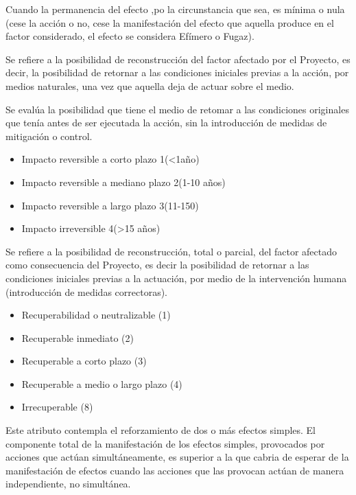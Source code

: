 Cuando la permanencia del efecto ,po la circunstancia que sea, es mínima o nula (cese la acción o no, cese la manifestación del efecto que aquella produce en el factor considerado, el efecto se considera Efímero o Fugaz).
\begin{definition}[Reversibilidad (RV)]
    Se refiere a la posibilidad de reconstrucción del factor afectado por el Proyecto, es decir, la posibilidad de retornar a las condiciones iniciales previas a la acción, por medios naturales, una vez que aquella deja de actuar sobre el medio.
\end{definition}

Se evalúa la posibilidad que tiene el medio de retomar a las condiciones originales que tenía antes de ser ejecutada la acción, sin la introducción de medidas de mitigación o control.
\begin{itemize}
    \item Impacto reversible a corto plazo 1(<1año)
    \item Impacto reversible a mediano plazo 2(1-10 años)
    \item Impacto reversible a largo plazo 3(11-150)
    \item Impacto irreversible 4(>15 años)
\end{itemize}
\begin{definition}[Recuperabilidad (MC)]
    Se refiere a la posibilidad de reconstrucción, total o parcial, del factor afectado como consecuencia del Proyecto, es decir la posibilidad de retornar a las condiciones iniciales previas a la actuación, por medio de la intervención humana (introducción de medidas correctoras).
\end{definition}
\begin{itemize}
    \item Recuperabilidad o neutralizable (1)
    \item Recuperable inmediato (2)
    \item Recuperable a corto plazo (3)
    \item Recuperable a medio o largo plazo (4)
    \item Irrecuperable (8)
\end{itemize}

\begin{definition}[Sinergia (SI)]
    Este atributo contempla el reforzamiento de dos o más efectos simples. El componente total de la manifestación de los efectos simples, provocados por acciones que actúan simultáneamente, es superior a la que cabria de esperar de la manifestación de efectos cuando las acciones que las provocan actúan de manera independiente, no simultánea.
\end{definition}


